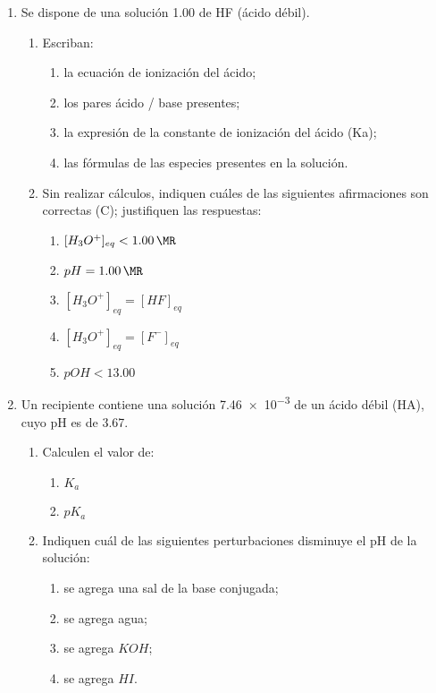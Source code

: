 \documentclass[../practica.root.tex]{subfiles}
\begin{document}
\begin{enumerate}
	\item[9.] Se dispone de una solución \SI{1,00}{\MR} de HF (ácido débil).
	      \begin{enumerate}
		      \item Escriban:
		            \begin{enumerate}
			            \item la ecuación de ionización del ácido;
			            \item los pares ácido / base presentes;
			            \item la expresión de la constante de ionización del ácido (Ka);
			            \item las fórmulas de las especies presentes en la solución.
		            \end{enumerate}
		      \item Sin realizar cálculos, indiquen cuáles de las siguientes afirmaciones son correctas
		            (C); justifiquen las respuestas:
		            \begin{enumerate}
			            \item $[H_3O^+]_{eq} < \SI{1,00}{\MR}$
			            \item $pH = \SI{1,00}{\MR}$
			            \item $[H_3O^+]_{eq} = [HF]_{eq}$
			            \item $[H_3O^+]_{eq} = [F^-]_{eq}$
			            \item $pOH < \num{13,00}$
		            \end{enumerate}
	      \end{enumerate}

	\item[10.] Un recipiente contiene una solución \SI{7,46e-3}{\MR} de un ácido débil (HA), cuyo pH es de \num{3,67}.
	      \begin{enumerate}
		      \item Calculen el valor de:
		            \begin{enumerate}
			            \item $K_a$
			            \item $pK_a$
		            \end{enumerate}
		      \item Indiquen cuál de las siguientes perturbaciones disminuye el pH de la solución:
		            \begin{enumerate}
			            \item se agrega una sal de la base conjugada;
			            \item se agrega agua;
			            \item se agrega $KOH$;
			            \item se agrega $HI$.
		            \end{enumerate}
	      \end{enumerate}


\end{enumerate}
\end{document}
